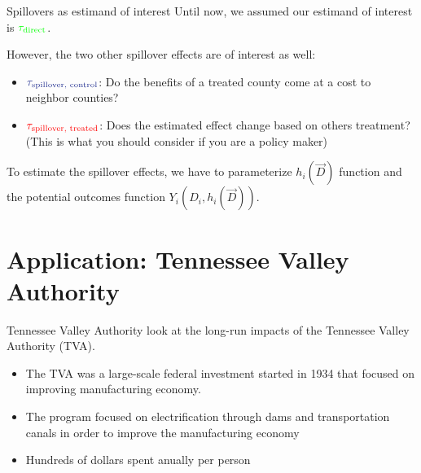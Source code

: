\documentclass[aspectratio=43]{beamer}
\begin{document}
\begin{frame}{Spillovers as estimand of interest}
    Until now, we assumed our estimand of interest is $\textcolor{green}{\tau_{\text{direct}}}$.

    However, the two other spillover effects are of interest as well:
    \begin{itemize}
        \item $\textcolor{purple}{\tau_{\text{spillover, control}}}$: Do the benefits of a treated county come at a cost to neighbor counties? 
        
        \item $\textcolor{red}{\tau_{\text{spillover, treated}}}$: Does the estimated effect change based on others treatment? (This is what you should consider if you are a policy maker)
    \end{itemize}

    To estimate the spillover effects, we have to parameterize $h_i(\vec{D})$ function and the potential outcomes function $Y_i(D_i, h_i(\vec{D}))$.
\end{frame}



\section{Application: Tennessee Valley Authority}

\begin{frame}{Tennessee Valley Authority}
    \citet{Kline_Moretti_2014} look at the long-run impacts of the Tennessee Valley Authority (TVA).

    \begin{itemize}
        \item The TVA was a large-scale federal investment started in 1934 that focused on improving manufacturing economy.
        
        \item The program focused on electrification through dams and transportation canals in order to improve the manufacturing economy
        
        \item Hundreds of dollars spent anually per person
    \end{itemize}
\end{frame}
\end{document}
